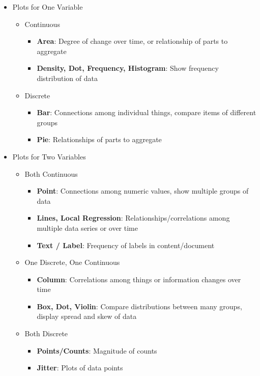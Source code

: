 \begin{itemize}
   \item Plots for One Variable
   \begin{itemize}
      \item Continuous 
      \begin{itemize}
		\item {\bf Area}: Degree of change over time, or relationship of parts to aggregate
		\item {\bf Density, Dot, Frequency, Histogram}: Show frequency distribution of data
	  \end{itemize}
	  \item Discrete
		\begin{itemize}
		  \item {\bf Bar}: Connections among individual things, compare items of different groups
		  \item {\bf Pie}: Relationships of parts to aggregate
		\end{itemize}
    \end{itemize}
    \item Plots for Two Variables
    \begin{itemize}
       \item Both Continuous
			\begin{itemize}
			  \item {\bf Point}: Connections among numeric values, show multiple groups of data
			  \item {\bf Lines, Local Regression}: Relationships/correlations among multiple data series or over time
			  \item {\bf Text / Label}: Frequency of labels in content/document
			\end{itemize}
	   \item One Discrete, One Continuous
			\begin{itemize}
			  \item {\bf Column}: Correlations among things or information changes over time
			  \item {\bf Box, Dot, Violin}: Compare distributions between many groups, display spread and skew of data
			\end{itemize}
	   \item Both Discrete
			\begin{itemize}
				\item {\bf Points/Counts}: Magnitude of counts
				\item {\bf Jitter}: Plots of data points
			\end{itemize}

\end{itemize}
\end{itemize}
